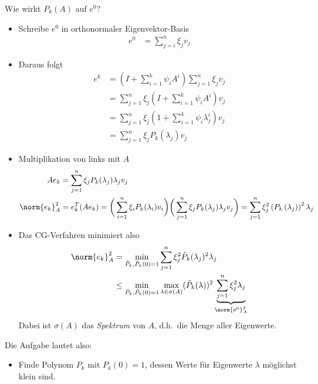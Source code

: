 Wie wirkt $P_k(A)$ auf $e^0$?
\begin{itemize}
 \item Schreibe $e^0$ in orthonormaler Eigenvektor-Basis
 \begin{align*}
   e^0 & =\sum_{j=i}^n \xi_jv_j
 \end{align*}
 \item Daraus folgt
 \begin{align*}
   e^k & = \left(I+\sum_{i=1}^k \psi_iA^i \right) \sum_{j=1}^n \xi_jv_j \\
   & = \sum_{j=1}^n \xi_j \left(I+\sum_{i=1}^k \psi_iA^i \right)v_j \\
   & = \sum_{j=1}^n \xi_j \left(1+\sum_{i=1}^k \psi_i \lambda_j^i \right)v_j \\
   & = \sum_{j=1}^n \xi_jP_k (\lambda_j)v_j
 \end{align*}
 \item Multiplikation von links mit $A$
 \begin{align*}
   Ae_k & = \sum_{j=1}^n \xi_jP_k (\lambda_j) \lambda_jv_j \\
   \norm{e_k}_A^2
   & =
   e_k^T (Ae_k)
   =
   \bigg(\sum_{i=1}^n \xi_iP_k (\lambda_i)v_i\bigg)
   \bigg(\sum_{j=1}^n \xi_jP_k (\lambda_j) \lambda_jv_j\bigg)
   =
   \sum_{j=1}^n \xi_j^2 \left(P_k \left( \lambda_j \right) \right)^2 \lambda_j
 \end{align*}
 \item Das CG-Verfahren minimiert also
  \begin{align*}
   \norm{e_k}_A^2 & = \min_{\tilde{P}_k,\tilde{P}_k(0)=1} \sum_{j=1}^n \xi_j^2 \tilde{P}_k (\lambda_j)^2 \lambda_j \\
   & \leq
   \min_{\tilde{P}_k,\tilde{P}_k(0)=1} \max_{\lambda \in \sigma (A)} (\tilde{P}_k (\lambda))^2
       \underbrace{\sum_{j=1}^n \xi_j^2 \lambda_j}_{\norm{e^0}_A^2}
  \end{align*}
  Dabei ist $\sigma(A)$ das \emph{Spektrum} von $A$, d.h.\ die Menge aller Eigenwerte.
\end{itemize}
Die Aufgabe lautet also:
\begin{itemize}
 \item Finde Polynom $P_k$ mit $P_k(0)=1$, dessen Werte für Eigenwerte $\lambda$ möglichst klein sind.
\end{itemize}

\bigskip


